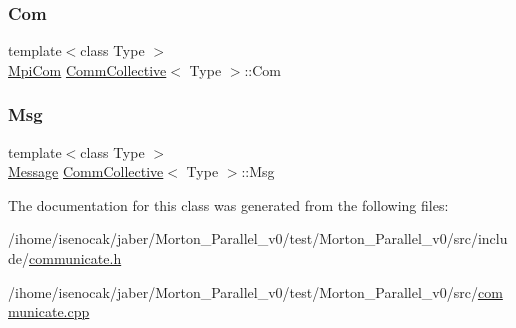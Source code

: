 \subsubsection{\texorpdfstring{Com}{Com}}
{\footnotesize\ttfamily template$<$class Type $>$ \\
\mbox{\hyperlink{structMpiCom}{Mpi\+Com}} \mbox{\hyperlink{classCommCollective}{Comm\+Collective}}$<$ Type $>$\+::Com\hspace{0.3cm}{\ttfamily [private]}}

\mbox{\label{classCommCollective_a2c03a93c4ffd512939d2b98cb7761224}} 
\subsubsection{\texorpdfstring{Msg}{Msg}}
{\footnotesize\ttfamily template$<$class Type $>$ \\
\mbox{\hyperlink{structMessage}{Message}} \mbox{\hyperlink{classCommCollective}{Comm\+Collective}}$<$ Type $>$\+::Msg\hspace{0.3cm}{\ttfamily [private]}}



The documentation for this class was generated from the following files\+:\begin{DoxyCompactItemize}
\item 
/ihome/isenocak/jaber/\+Morton\+\_\+\+Parallel\+\_\+v0/test/\+Morton\+\_\+\+Parallel\+\_\+v0/src/include/\mbox{\hyperlink{communicate_8h}{communicate.\+h}}\item 
/ihome/isenocak/jaber/\+Morton\+\_\+\+Parallel\+\_\+v0/test/\+Morton\+\_\+\+Parallel\+\_\+v0/src/\mbox{\hyperlink{communicate_8cpp}{communicate.\+cpp}}\end{DoxyCompactItemize}
